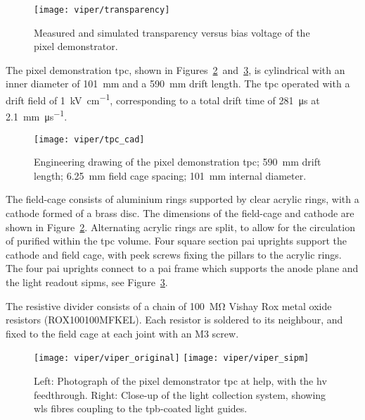 \begin{figure}[htb]
	\centering
	\texttt{[image: viper/transparency]}
	\caption[Pixel demonstrator charge readout transparency]{%
		Measured and simulated transparency versus bias voltage of the \AC{} pixel demonstrator.~\cite{francypants}
	}
	\label{fig:viper_transparency}
\end{figure}

The pixel demonstration \gls{tpc}, shown in Figures~\ref{fig:viper_cad}~and~\ref{fig:viper_v1per}, is cylindrical with an inner diameter of \SI{101}{\milli\metre} and a \SI{590}{\milli\metre} drift length. 
The \gls{tpc} operated with a drift field of \SI{1}{\kilo\volt\per\centi\metre}, corresponding to a total drift time of \SI{281}{\micro\second} at \SI{2.1}{\milli\metre\per\micro\second}.~\cite{protoLASER}

\begin{figure}[htb]
	\centering
	\texttt{[image: viper/tpc\_cad]}
	\caption[Engineering drawing of pixel demonstrator ]{%
		Engineering drawing of the pixel demonstration \acrshort{tpc}; \SI{590}{\milli\metre} drift length; \SI{6.25}{\milli\metre} field cage spacing; \SI{101}{\milli\metre} internal diameter.
	}
	\label{fig:viper_cad}
\end{figure}
 
The field-cage consists of aluminium rings supported by clear acrylic rings, with a cathode formed of a brass disc. 
The dimensions of the field-cage and cathode are shown in Figure~\ref{fig:viper_cad}.
Alternating acrylic rings are split, to allow for the circulation of purified \lar{} within the \gls{tpc} volume.
Four square section \gls{pai} uprights support the cathode and field cage, with \gls{peek} screws fixing the pillars to the acrylic rings.
The four \gls{pai} uprights connect to a \gls{pai} frame which supports the anode plane and the light readout \glspl{sipm}, see Figure~\ref{fig:viper_v1per}.   

The resistive divider consists of a chain of \SI{100}{\mega\ohm} Vishay Rox metal oxide resistors (ROX100100MFKEL).
Each resistor is soldered to its neighbour, and fixed to the field cage at each joint with an M3 screw.   

\begin{figure}[htb]
	\centering
	\texttt{[image: viper/viper\_original]}
	\texttt{[image: viper/viper\_sipm]}
	\caption[Pixel demonstrator close-up]{%
		Left: Photograph of the  pixel demonstrator \acrshort{tpc} at \acrshort{help}, with the \acrshort{hv} feedthrough.
		Right: Close-up of the light collection system, showing \acrshort{wls} fibres coupling  to the \acrshort{tpb}-coated light guides.
	}
	\label{fig:viper_v1per}
\end{figure}


